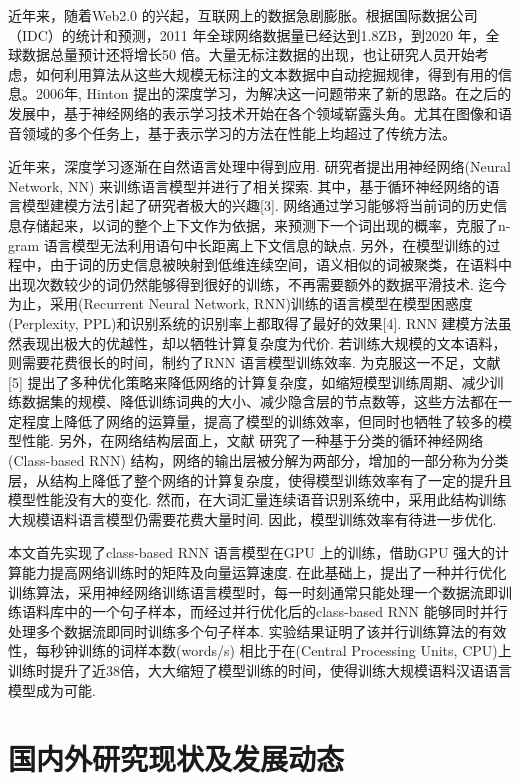 \documentclass[12pt,a4paper]{article}
\begin{document}
近年来，随着Web2.0 的兴起，互联网上的数据急剧膨胀。根据国际数据公司（IDC）的统计和预测，2011 年全球网络数据量已经达到1.8ZB，到2020 年，全球数据总量预计还将增长50 倍。大量无标注数据的出现，也让研究人员开始考虑，如何利用算法从这些大规模无标注的文本数据中自动挖掘规律，得到有用的信息。2006年, Hinton 提出的深度学习\cite{hinton2006reducing}，为解决这一问题带来了新的思路。在之后的发展中，基于神经网络的表示学习技术开始在各个领域崭露头角。尤其在图像和语音领域的多个任务上，基于表示学习的方法在性能上均超过了传统方法。

近年来，深度学习逐渐在自然语言处理中得到应用. 研究者提出用神经网络(Neural Network, NN) 来训练语言模型并进行了相关探索\cite{DBLP:conf/nips/BengioDV00}. 其中，基于循环神经网络的语言模型建模方法引起了研究者极大的兴趣[3]. 网络通过学习能够将当前词的历史信息存储起来，以词的整个上下文作为依据，来预测下一个词出现的概率，克服了n-gram 语言模型无法利用语句中长距离上下文信息的缺点. 另外，在模型训练的过程中，由于词的历史信息被映射到低维连续空间，语义相似的词被聚类，在语料中出现次数较少的词仍然能够得到很好的训练，不再需要额外的数据平滑技术. 迄今为止，采用(Recurrent Neural Network, RNN)训练的语言模型在模型困惑度(Perplexity, PPL)和识别系统的识别率上都取得了最好的效果[4]. RNN 建模方法虽然表现出极大的优越性，却以牺牲计算复杂度为代价. 若训练大规模的文本语料，则需要花费很长的时间，制约了RNN 语言模型训练效率. 为克服这一不足，文献[5] 提出了多种优化策略来降低网络的计算复杂度，如缩短模型训练周期、减少训练数据集的规模、降低训练词典的大小、减少隐含层的节点数等，这些方法都在一定程度上降低了网络的运算量，提高了模型的训练效率，但同时也牺牲了较多的模型性能. 另外，在网络结构层面上，文献\cite{DBLP:journals/coling/BrownPdLM92} 研究了一种基于分类的循环神经网络(Class-based RNN) 结构，网络的输出层被分解为两部分，增加的一部分称为分类层，从结构上降低了整个网络的计算复杂度，使得模型训练效率有了一定的提升且模型性能没有大的变化. 然而，在大词汇量连续语音识别系统中，采用此结构训练大规模语料语言模型仍需要花费大量时间. 因此，模型训练效率有待进一步优化.


本文首先实现了class-based RNN 语言模型在GPU 上的训练，借助GPU 强大的计算能力提高网络训练时的矩阵及向量运算速度. 在此基础上，提出了一种并行优化训练算法，采用神经网络训练语言模型时，每一时刻通常只能处理一个数据流即训练语料库中的一个句子样本，而经过并行优化后的class-based RNN 能够同时并行处理多个数据流即同时训练多个句子样本. 实验结果证明了该并行训练算法的有效性，每秒钟训练的词样本数(words/s) 相比于在(Central Processing Units, CPU)上训练时提升了近38倍，大大缩短了模型训练的时间，使得训练大规模语料汉语语言模型成为可能.

\section{国内外研究现状及发展动态}
\end{document}
